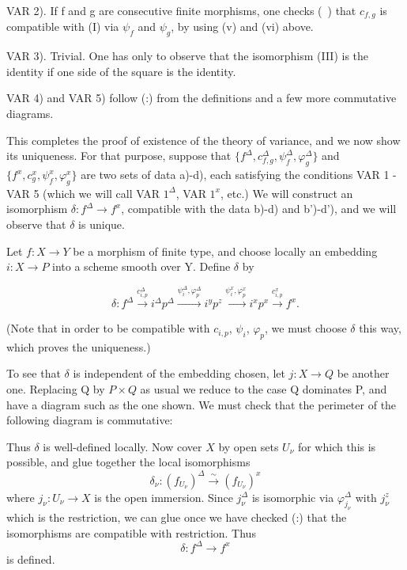 \documentclass[12pt]{book}
\begin{document}
VAR 2). If f and g are consecutive finite morphisms, one checks (~) that \(c_{f,g}\) is compatible with (I) via \(\psi_{f}\) and \(\psi_{g}\), by using (v) and (vi) above.

\setcounter{page}{331}
VAR 3). Trivial. One has only to observe that the isomorphism (III) is the identity if one side of the square is the identity.

VAR 4) and VAR 5) follow (:) from the definitions and a few more commutative diagrams.

This completes the proof of existence of the theory of variance, and we now show its uniqueness.
For that purpose, suppose that \(\{f^{\Delta}, c_{f,g}^{\Delta}, \psi_{f}^{\Delta}, \varphi_{g}^{\Delta}\}\) and \(\{f^{x}, c_{g}^{x}, \psi_{f}^{x}, \varphi_{g}^{x}\}\)
are two sets of data a)-d), each satisfying the conditions VAR 1 - VAR 5 (which we will call VAR \(1^{\Delta}\), VAR \(1^{x}\), etc.)
We will construct an isomorphism \(\delta: f^{\Delta} \to f^{x}\), compatible with the data b)-d) and b')-d'), and we will observe that \(\delta\) is unique.

Let \(f: X \to Y\) be a morphism of finite type, and choose locally an embedding \(i: X \to P\) into a scheme smooth over Y.
Define \(\delta\) by

\setcounter{page}{332}
\[\delta: f^{\Delta} \stackrel{c_{i,p}^{\Delta}}{\to} i^{\Delta} p^{\Delta} \stackrel{\psi_{i}^{\Delta}, \varphi_{p}^{\Delta}}{\to} i^{y} p^{z} \stackrel{\psi_{i}^{x}, \varphi_{p}^{x}}{\to} i^{x} p^{x} \stackrel{c_{i,p}^{x}}{\to} f^{x} .\]

(Note that in order to be compatible with \(c_{i,p}\), \(\psi_{i}\), \(\varphi_{p}\), we must choose \(\delta\) this way, which proves the uniqueness.)

To see that \(\delta\) is independent of the embedding chosen, let \(j: X \to Q\) be another one.
Replacing Q by \(P\times Q\) as usual we reduce to the case Q dominates P, and have a diagram such as the one shown.
We must check that the perimeter of the following diagram is commutative:

\setcounter{page}{333}
Thus \(\delta\) is well-defined locally. Now cover \(X\) by open sets \(U_{\nu}\) for which this is possible, and glue together the local isomorphisms
\[\delta_{\nu}:\left(f_{U_{\nu}}\right)^{\Delta} \stackrel{\sim}{\to}\left(f_{U_{\nu}}\right)^{x}\]
where \(j_{\nu}: U_{\nu} \to X\) is the open immersion.
Since \(j_{\nu}^{\Delta}\) is isomorphic via \(\varphi_{j_{\nu}}^{\Delta}\) with \(j_{\nu}^{z}\) which is the restriction, we can glue once we have checked (:) that the isomorphisms are compatible with restriction.
Thus
\[\delta: f^{\Delta} \to f^{x}\]
is defined.
\end{document}
